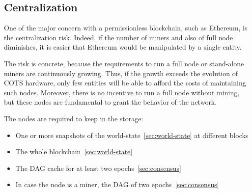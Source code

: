 \subsection{Centralization}

One of the major concern with a permissionless blockchain, such as Ethereum,
is the centralization risk. Indeed, if the number of miners and also of full
node diminishes, it is easier that Ethereum would be manipulated by a single
entity.

The risk is concrete, because the requirements to run a full node or 
stand-alone miners are continuously growing. Thus, if the growth exceeds the
evolution of COTS hardware, only few entities will be able to afford the 
costs of maintaining such nodes. Moreover, there is no incentive to run a full
node without mining, but these nodes are fundamental to grant the behavior of
the network.

The nodes are required to keep in the storage:
\begin{itemize}
    \item One or more snapshots of the world-state~\autoref{sec:world-state}
    at different blocks
    \item The whole blockchain~\autoref{sec:world-state}
    \item The DAG cache for at least two epochs~\autoref{sec:consensus}
    \item In case the node is a miner, the DAG of two 
    epochs~\autoref{sec:consensus}
\end{itemize}

